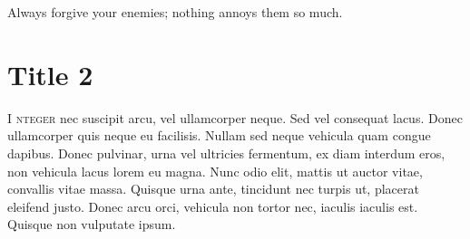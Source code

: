 
\begin{savequote}[85mm]
    {\color{stdgrey}Always forgive your enemies; nothing annoys them so much.}

\end{savequote}

\chapter{Title 2}
\label{chap:second_chapter}

    \lettrine[lines=4,findent=5pt]{\textcolor{stdgrey}{I}}{ nteger} nec suscipit arcu, vel ullamcorper neque. Sed vel consequat lacus. Donec ullamcorper quis neque eu facilisis. Nullam sed neque vehicula quam congue dapibus. Donec pulvinar, urna vel ultricies fermentum, ex diam interdum eros, non vehicula lacus lorem eu magna. Nunc odio elit, mattis ut auctor vitae, convallis vitae massa. Quisque urna ante, tincidunt nec turpis ut, placerat eleifend justo. Donec arcu orci, vehicula non tortor nec, iaculis iaculis est. Quisque non vulputate ipsum.


